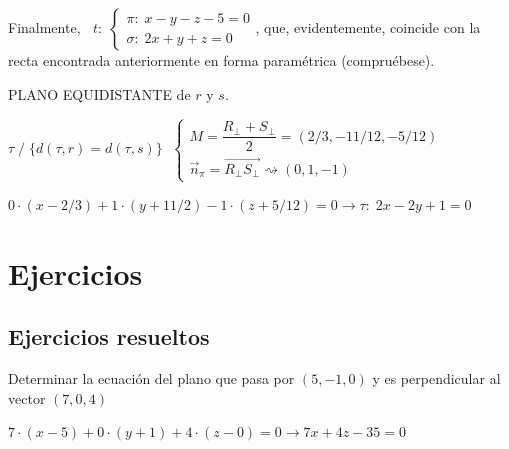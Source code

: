  \noindent Finalmente,  $\;\;t:\; \begin{cases} \pi:\;x-y-z-5=0 \\ \sigma:\; 2x+y+z=0 \end{cases}$, que, evidentemente, coincide con la recta encontrada anteriormente en forma paramétrica (compruébese).
 

\vspace{2mm} \noindent  PLANO EQUIDISTANTE de $r$ y $s$.

\noindent 
$\tau\;$$/\;\{d(\tau,r)=d(\tau,s)\}\;$
$\begin{cases} M=\dfrac{R_\bot + S_\bot}{2}=(2/3,-11/12,-5/12) \\ \vec n_{\pi}=\overrightarrow{R_\bot S_\bot} \rightsquigarrow(0,1,-1) \end{cases}$


\vspace{3mm}\noindent $0\cdot(x-2/3)+1\cdot (y+11/2)-1\cdot(z+5/12)=0 \to \tau:\; 2x-2y+1=0$

\section{Ejercicios}

\subsection{Ejercicios resueltos}


\begin{ejre}
	Determinar la ecuación del plano que pasa por $(5,-1,0)$ y es perpendicular al vector $(7,0,4)$
\end{ejre}
\begin{proofw}\renewcommand{\qedsymbol}{$\diamond$}
	$7\cdot(x-5)+0\cdot(y+1)+4\cdot(z-0)=0 \to 7x+4z-35=0$
\end{proofw}


